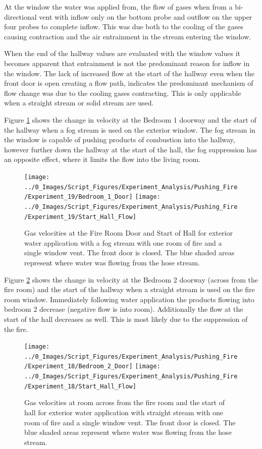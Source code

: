 \documentclass[12pt,oneside]{book}
\begin{document}
At the window the water was applied from, the flow of gases when from a bi-directional vent with inflow only on the bottom probe and outflow on the upper four probes to complete inflow. This was due both to the cooling of the gases causing contraction and the air entrainment in the stream entering the window. 

When the end of the hallway values are evaluated with the window values it becomes apparent that entrainment is not the predominant reason for inflow in the window. The lack of increased flow at the start of the hallway even when the front door is open creating a flow path, indicates the predominant mechanism of flow change was due to the cooling gases contracting. This is only applicable when a straight stream or solid stream are used. 

Figure \ref{fig:push_fire_dead_end_fog} shows the change in velocity at the Bedroom 1 doorway and the start of the hallway when a fog stream is used on the exterior window.  The fog stream in the window is capable of pushing products of combustion into the hallway, however further down the hallway at the start of the hall, the fog suppression has an opposite effect, where it limits the flow into the living room. 

\begin{figure}[H]
\centering
\texttt{[image: ../0\_Images/Script\_Figures/Experiment\_Analysis/Pushing\_Fire/Experiment\_19/Bedroom\_1\_Door]}
\texttt{[image: ../0\_Images/Script\_Figures/Experiment\_Analysis/Pushing\_Fire/Experiment\_19/Start\_Hall\_Flow]}
\caption[Gas Velocities - Single Room of Fire - Exterior Fog]{Gas velocities at the Fire Room Door and Start of Hall for exterior water application with a fog stream with one room of fire and a single window vent. The front door is closed. The blue shaded areas represent where water was flowing from the hose stream.}
\label{fig:push_fire_dead_end_fog}
\end{figure}

Figure \ref{fig:push_fire_SS_BR2} shows the change in velocity at the Bedroom 2 doorway (across from the fire room) and the start of the hallway when a straight stream is used on the fire room window. Immediately following water application the products flowing into bedroom 2 decrease (negative flow is into room). Additionally the flow at the start of the hall decreases as well. This is most likely due to the suppression of the fire. 

\begin{figure}[H]
\centering
\texttt{[image: ../0\_Images/Script\_Figures/Experiment\_Analysis/Pushing\_Fire/Experiment\_18/Bedroom\_2\_Door]}
\texttt{[image: ../0\_Images/Script\_Figures/Experiment\_Analysis/Pushing\_Fire/Experiment\_18/Start\_Hall\_Flow]}
\caption[Gas Velocities - Single Room of Fire - Exterior Straight Stream]{Gas velocities at room across from the fire room and the start of hall for exterior water application with straight stream with one room of fire and a single window vent. The front door is closed. The blue shaded areas represent where water was flowing from the hose stream. }
\label{fig:push_fire_SS_BR2}
\end{figure}
\end{document}
